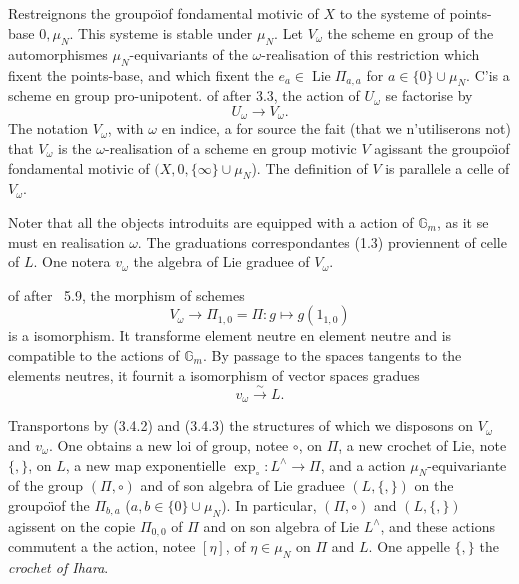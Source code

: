\documentclass[11pt,a4paper]{article}
\theoremstyle{plain}
\theoremstyle{definition}
\DeclareMathOperator{\Lie}{Lie}
\newcommand{\Gm}{\mathbb{G}_m}
\begin{document}
\subsection{}
Restreignons the groupo\"{\i}of fondamental motivic of $X$ to the systeme of points-base $0, \mu_N$. This systeme is stable under $\mu_N$. Let $V_\omega$ the scheme en group of the automorphismes $\mu_N$-equivariants of the $\omega$-realisation of this restriction which fixent the points-base, and which fixent the $e_a \in \Lie \Pi_{a,a}$ for $a \in \{0\} \cup \mu_N$. C'is a scheme en group pro-unipotent. of after 3.3, the action of $U_\omega$ se factorise by
\begin{equation}\label{eq:3.4.1}
U_\omega \to V_\omega.
\end{equation}
The notation $V_\omega$, with $\omega$ en indice, a for source the fait (that we n'utiliserons not) that $V_\omega$ is the $\omega$-realisation of a scheme en group motivic $V$ agissant the groupo\"{\i}of fondamental motivic of $(X, 0, \{\infty\} \cup \mu_N$). The definition of $V$ is parallele a celle of $V_\omega$.

Noter that all the objects introduits are equipped with a action of $\Gm$, as it se must en realisation $\omega$. The graduations correspondantes (1.3) proviennent of celle of $L$. One notera $v_\omega$ the algebra of Lie graduee of $V_\omega$.

of after \cite{1}~5.9, the morphism of schemes
\begin{equation}\label{eq:3.4.2}
V_\omega \to \Pi_{1,0} = \Pi: g \mapsto g(1_{1,0})
\end{equation}
is a isomorphism. It transforme element neutre en element neutre and is compatible to the actions of $\Gm$. By passage to the spaces tangents to the elements neutres, it fournit a isomorphism of vector spaces gradues
\begin{equation}\label{eq:3.4.3}
v_\omega \xrightarrow{\sim} L.
\end{equation}

Transportons by (3.4.2) and (3.4.3) the structures of which we disposons on $V_\omega$ and $v_\omega$. One obtains a new loi of group, notee $\circ$, on $\Pi$, a new crochet of Lie, note $\{,\}$, on $L$, a new map exponentielle $\exp_\circ: L^{\wedge} \to \Pi$, and a action $\mu_N$-equivariante of the group $(\Pi, \circ)$ and of son algebra of Lie graduee $(L, \{,\})$ on the groupo\"{\i}of the $\Pi_{b,a}$ ($a,b \in \{0\} \cup \mu_N$). In particular, $(\Pi, \circ)$ and $(L, \{,\})$ agissent on the copie $\Pi_{0,0}$ of $\Pi$ and on son algebra of Lie $L^{\wedge}$, and these actions commutent a the action, notee $[\eta]$, of $\eta \in \mu_N$ on $\Pi$ and $L$. One appelle $\{,\}$ the {\em crochet of Ihara}.
\end{document}
